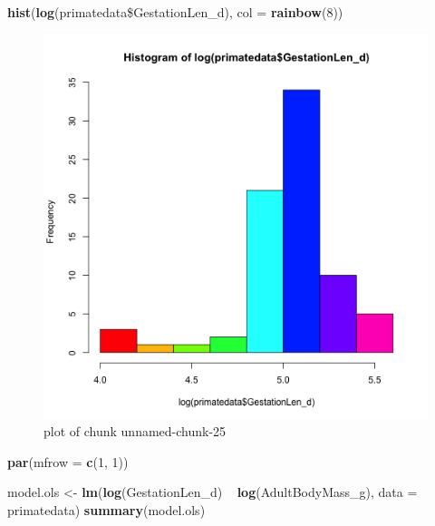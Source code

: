 \documentclass[]{article}
\newenvironment{Shaded}{\begin{snugshade}}{\end{snugshade}}
\newcommand{\KeywordTok}[1]{\textcolor[rgb]{0.13,0.29,0.53}{\textbf{{#1}}}}
\newcommand{\DataTypeTok}[1]{\textcolor[rgb]{0.13,0.29,0.53}{{#1}}}
\newcommand{\DecValTok}[1]{\textcolor[rgb]{0.00,0.00,0.81}{{#1}}}
\newcommand{\StringTok}[1]{\textcolor[rgb]{0.31,0.60,0.02}{{#1}}}
\newcommand{\NormalTok}[1]{{#1}}
\begin{document}
\begin{Shaded}
\begin{Highlighting}[]
\KeywordTok{hist}\NormalTok{(}\KeywordTok{log}\NormalTok{(primatedata\$GestationLen_d), }\DataTypeTok{col =} \KeywordTok{rainbow}\NormalTok{(}\DecValTok{8}\NormalTok{))}
\end{Highlighting}
\end{Shaded}

\begin{figure}[htbp]
\centering
\includegraphics{figure/unnamed-chunk-25.png}
\caption{plot of chunk unnamed-chunk-25}
\end{figure}

\begin{Shaded}
\begin{Highlighting}[]
\KeywordTok{par}\NormalTok{(}\DataTypeTok{mfrow =} \KeywordTok{c}\NormalTok{(}\DecValTok{1}\NormalTok{, }\DecValTok{1}\NormalTok{))}
\end{Highlighting}
\end{Shaded}

\begin{Shaded}
\begin{Highlighting}[]
\NormalTok{model.ols <-}\StringTok{ }\KeywordTok{lm}\NormalTok{(}\KeywordTok{log}\NormalTok{(GestationLen_d) ~}\StringTok{ }\KeywordTok{log}\NormalTok{(AdultBodyMass_g), }\DataTypeTok{data =} \NormalTok{primatedata)}
\KeywordTok{summary}\NormalTok{(model.ols)}
\end{Highlighting}
\end{Shaded}
\end{document}
